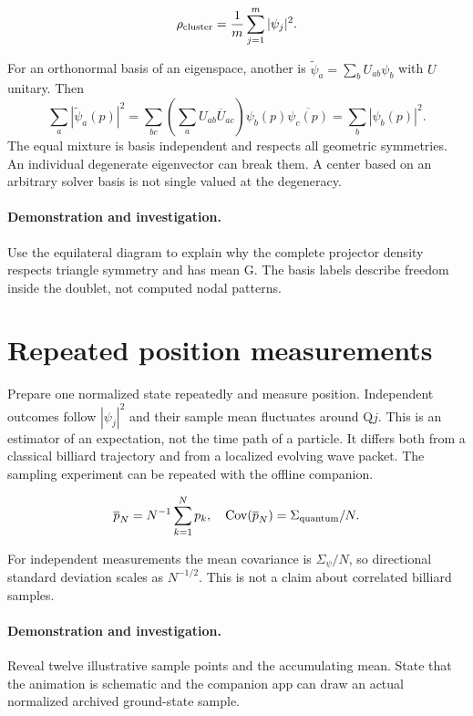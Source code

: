 \documentclass[11pt,oneside,openany]{book}
\begin{document}
\[\rho_{\rm cluster}=\frac1m\sum_{j=1}^m|\psi_j|^2.\]



For an orthonormal basis of an eigenspace, another is
$\widetilde\psi_a=\sum_bU_{ab}\psi_b$ with $U$ unitary. Then
\[
\sum_a|\widetilde\psi_a(p)|^2
=\sum_{bc}\left(\sum_aU_{ab}\overline U_{ac}\right)
\psi_b(p)\overline{\psi_c(p)}
=\sum_b|\psi_b(p)|^2.
\]
The equal mixture is basis independent and respects all geometric
symmetries. An individual degenerate eigenvector can break them.
A center based on an arbitrary solver basis is not single valued
at the degeneracy.




\paragraph{Demonstration and investigation.} Use the equilateral diagram to explain why the complete projector density respects triangle symmetry and has mean G. The basis labels describe freedom inside the doublet, not computed nodal patterns.


\section{Repeated position measurements}\label{sec:slide52}

Prepare one normalized state repeatedly and measure position.
Independent outcomes follow $|\psi_j|^2$ and their sample mean
fluctuates around Q$j$. This is an estimator of an expectation,
not the time path of a particle. It differs both from a classical
billiard trajectory and from a localized evolving wave packet.
The sampling experiment can be repeated with the offline companion.


\[\overline p_N=N^{-1}\sum_{k=1}^Np_k,\quad \operatorname{Cov}(\overline p_N)=\Sigma_{\rm quantum}/N.\]


For independent measurements the mean covariance is
$\Sigma_\psi/N$, so directional standard deviation scales as
$N^{-1/2}$. This is not a claim about correlated billiard samples.



\paragraph{Demonstration and investigation.} Reveal twelve illustrative sample points and the accumulating mean. State that the animation is schematic and the companion app can draw an actual normalized archived ground-state sample.
\end{document}
